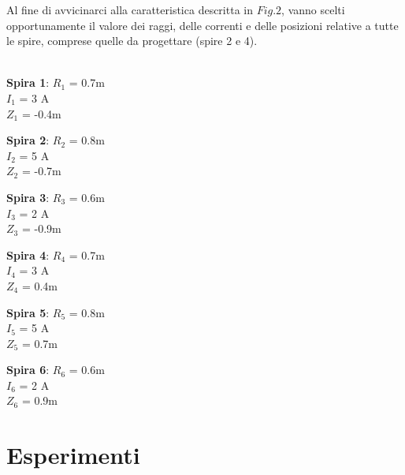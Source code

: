 \documentclass[a4paper, 11pt]{article}
\begin{document}
Al fine di avvicinarci alla caratteristica descritta in $Fig. 2$, vanno
scelti opportunamente il valore dei raggi, delle correnti e delle posizioni
relative a tutte le spire, comprese quelle da progettare (spire 2 e 4). \\ \\
\centerline{ \textbf{Spira 1}: $R_{1}$ = 0.7m \\ $I_{1}$ = 3 A \\ $Z_{1}$ = -0.4m} 
\centerline{ \textbf{Spira 2}: $R_{2}$ = 0.8m \\ $I_{2}$ = 5 A \\ $Z_{2}$ = -0.7m}
\centerline{ \textbf{Spira 3}: $R_{3}$ = 0.6m \\ $I_{3}$ = 2 A \\ $Z_{3}$ = -0.9m}
\centerline{ \textbf{Spira 4}: $R_{4}$ = 0.7m \\ $I_{4}$ = 3 A \\ $Z_{4}$ = 0.4m}
\centerline{ \textbf{Spira 5}: $R_{5}$ = 0.8m \\ $I_{5}$ = 5 A \\ $Z_{5}$ = 0.7m}
\centerline{ \textbf{Spira 6}: $R_{6}$ = 0.6m \\ $I_{6}$ = 2 A \\ $Z_{6}$ = 0.9m}

\section*{Esperimenti}


\begin{thebibliography}{9}
\end{thebibliography}
\end{document}
